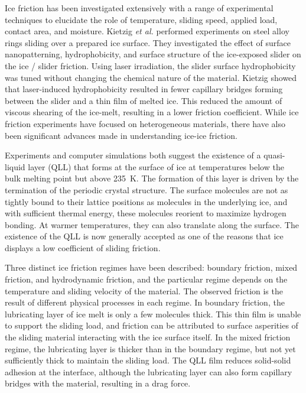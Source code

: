 Ice friction has been investigated extensively with a range
of experimental techniques to elucidate the role of
temperature,\cite{Bowden1939,Evans1976,Roberts1981,Derjaguin1988,Liang2003,Higgins2008} sliding speed,\cite{Evans1976,Derjaguin1988,Liang2003} applied
load,\cite{Bowden1939,Oksanen1982,Derjaguin1988,Buhl2001,Baurle2006}
contact area,\cite{Bowden1939,Baurle2007} and
moisture.\cite{Calabrese1980} Kietzig \textit{et al.} performed
experiments on steel alloy rings sliding over a prepared ice
surface.\cite{Kietzig2009} They investigated the effect of surface
nanopatterning, hydrophobicity, and surface structure of the
ice-exposed slider on the ice / slider friction.
Using laser irradiation, the slider surface hydrophobicity was tuned
without changing the chemical nature of the material. Kietzig showed
that laser-induced hydrophobicity resulted in fewer capillary bridges
forming between the slider and a thin film of melted ice. This reduced
the amount of viscous shearing of the ice-melt, resulting in a lower
friction coefficient.
While ice friction experiments have focused on heterogeneous
materials,\cite{Bowden1939,Evans1976,Derjaguin1988,Liang2003,Liang2005,Baurle2006,Baurle2007,Kietzig2009,Kietzig2010}
there have also been significant advances made in understanding
ice-ice
friction.\cite{Oksanen1982,Kennedy2000,Maeno2004,Fortt2007,Fortt2011,Lishman2011,Samadashvili2013}

Experiments and computer simulations both suggest the existence of a
quasi-liquid layer (QLL) that forms at the surface of ice at
temperatures below the bulk melting point but above
235~K.\cite{Kroes1992,Ikeda-Fukazawa2004,Picaud2006,Conde2008,Bartels-Rausch2014,Sancheza2017}
The formation of this layer is driven by the termination of the
periodic crystal structure. The surface molecules are not as tightly
bound to their lattice positions as molecules in the underlying ice,
and with sufficient thermal energy, these molecules reorient to
maximize hydrogen bonding. At warmer temperatures, they can also
translate along the surface.\cite{Pfalzgraff2011,Bartels-Rausch2014}
The existence of the QLL is now generally accepted as one of the
reasons that ice displays a low coefficient of sliding
friction.\cite{Dash1995,Rosenberg2005,Dash2006,Malenkov2009}

Three distinct ice friction regimes have been described:
boundary friction, mixed friction, and hydrodynamic friction, and the
particular regime depends on the temperature and sliding velocity of
the
material.\cite{Bhushan2002,Kietzig2009,Kietzig2010,Persson2015,Tuononen2016}
The observed friction is the result of different physical processes in
each regime. In boundary friction, the lubricating layer of ice melt
is only a few molecules thick. This thin film is unable to support the
sliding load, and friction can be attributed to surface asperities of
the sliding material interacting with the ice surface
itself.\cite{Bhushan2002} In the mixed friction regime, the
lubricating layer is thicker than in the boundary regime, but not yet
sufficiently thick to maintain the sliding load. The QLL film reduces
solid-solid adhesion at the interface, although the lubricating layer
can also form capillary bridges with the material, resulting in a drag
force.\cite{Kietzig2009,Kietzig2010}

